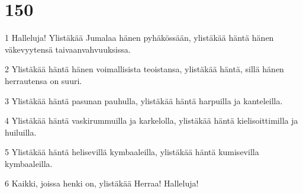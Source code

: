 \chapter{150}

\par 1 Halleluja! Ylistäkää Jumalaa hänen pyhäkössään, ylistäkää häntä hänen väkevyytensä taivaanvahvuuksissa.
\par 2 Ylistäkää häntä hänen voimallisista teoistansa, ylistäkää häntä, sillä hänen herrautensa on suuri.
\par 3 Ylistäkää häntä pasunan pauhulla, ylistäkää häntä harpuilla ja kanteleilla.
\par 4 Ylistäkää häntä vaskirummuilla ja karkelolla, ylistäkää häntä kielisoittimilla ja huiluilla.
\par 5 Ylistäkää häntä helisevillä kymbaaleilla, ylistäkää häntä kumisevilla kymbaaleilla.
\par 6 Kaikki, joissa henki on, ylistäkää Herraa! Halleluja!



